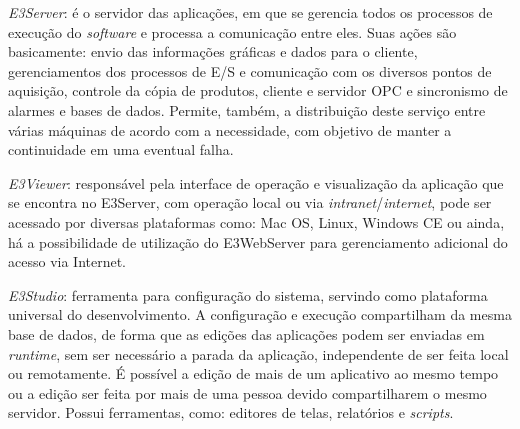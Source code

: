     \begin{alineascomponto}
    	\item \textit{E3Server}: é o servidor das aplicações, em que se gerencia todos os processos de execução do \textit{software} e processa a comunicação entre eles. Suas ações são basicamente: envio das informações gráficas e dados para o cliente, gerenciamentos dos processos de E/S e comunicação com os diversos pontos de aquisição, controle da cópia de produtos, cliente e servidor OPC e sincronismo de alarmes e bases de dados. Permite, também, a distribuição deste serviço entre várias máquinas de acordo com a necessidade, com objetivo de manter a continuidade em uma eventual falha.
    	\item \textit{E3Viewer}: responsável pela interface de operação e visualização da aplicação que se encontra no E3Server, com operação local ou via \textit{intranet}/\textit{internet}, pode ser acessado por diversas plataformas como: Mac OS, Linux, Windows CE ou ainda, há a possibilidade de utilização do E3WebServer para gerenciamento adicional do acesso via Internet.
    	\item \textit{E3Studio}: ferramenta para configuração do sistema, servindo como plataforma universal do desenvolvimento. A configuração e execução compartilham da mesma base de dados, de forma que as edições das aplicações podem ser enviadas em \textit{runtime}, sem ser necessário a parada da aplicação, independente de ser feita local ou remotamente. É possível a edição de mais de um aplicativo ao mesmo tempo ou a edição ser feita por mais de uma pessoa devido compartilharem o mesmo servidor. Possui ferramentas, como: editores de telas, relatórios e \textit{scripts}.
    \end{alineascomponto}
    
    \begin{figure}[!h]
    \end{figure}

